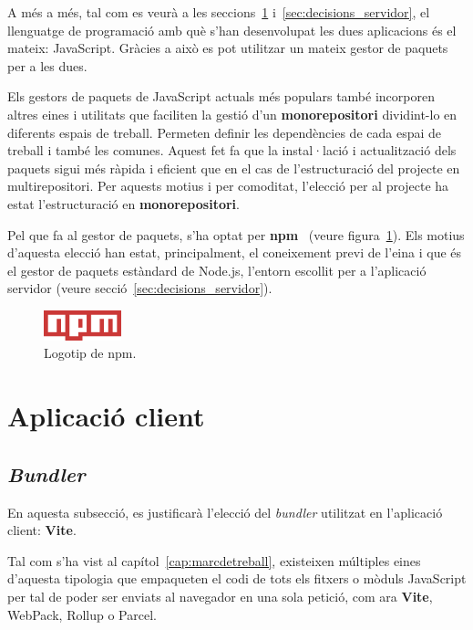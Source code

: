 \documentclass[a4paper,12pt]{ThesisStyle}
\begin{document}
A més a més, tal com es veurà a les seccions~\ref{sec:decisions_client} i~\ref{sec:decisions_servidor}, el llenguatge de programació amb què s'han desenvolupat les dues aplicacions és el mateix: JavaScript. Gràcies a això es pot utilitzar un mateix gestor de paquets per a les dues.

Els gestors de paquets de JavaScript actuals més populars també incorporen altres eines i utilitats que faciliten la gestió d'un \textbf{monorepositori} dividint-lo en diferents espais de treball. Permeten definir les dependències de cada espai de treball i també les comunes. Aquest fet fa que la instal·lació i actualització dels paquets sigui més ràpida i eficient que en el cas de l'estructuració del projecte en multirepositori. Per aquests motius i per comoditat, l'elecció per al projecte ha estat l'estructuració en \textbf{monorepositori}.

Pel que fa al gestor de paquets, s'ha optat per \textbf{npm}~\cite{npm} (veure figura~\ref{img:logo_npm}). Els motius d'aquesta elecció han estat, principalment, el coneixement previ de l'eina i que és el gestor de paquets estàndard de Node.js, l'entorn escollit per a l'aplicació servidor (veure secció~\ref{sec:decisions_servidor}).

\begin{figure}[H]
  \centering
  \includegraphics[width=0.2\textwidth]{assets/logos/NPM.png}
  \caption{\label{img:logo_npm}Logotip de npm.}
\end{figure}

\section{Aplicació client}
\label{sec:decisions_client}

\subsection{\textit{Bundler}}
\label{subsec:decisions_client_bundler}

En aquesta subsecció, es justificarà l'elecció del \textit{bundler} utilitzat en l'aplicació client: \textbf{Vite}.

Tal com s'ha vist al capítol~\ref{cap:marcdetreball}, existeixen múltiples eines d'aquesta tipologia que empaqueten el codi de tots els fitxers o mòduls JavaScript per tal de poder ser enviats al navegador en una sola petició, com ara \textbf{Vite}, WebPack, Rollup o Parcel.
\end{document}
